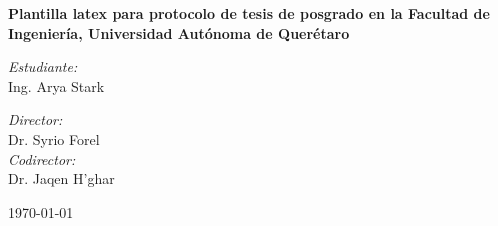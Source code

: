 
\begin{titlepage}

\vspace*{10cm}
{\huge \bfseries \textcolor{RojoUAQ}{Plantilla latex para protocolo de tesis de posgrado en la Facultad de Ingeniería, Universidad Autónoma de Querétaro}\\[1cm] }

\begin{center}
	\noindent
	\begin{minipage}{0.4\textwidth}
	\begin{flushleft} \large
	\emph{Estudiante:}\\
	Ing. Arya Stark
	\end{flushleft}
	\end{minipage}	
	\begin{minipage}{0.4\textwidth}
	\begin{flushright} \large
	\emph{Director:} \\
	Dr. Syrio Forel \\[1.5cm]
	\emph{Codirector:} \\
	Dr. Jaqen H'ghar
	\end{flushright}
	\end{minipage}
    
	\vfill
    
	{\large \today}
\end{center}
\end{titlepage}
